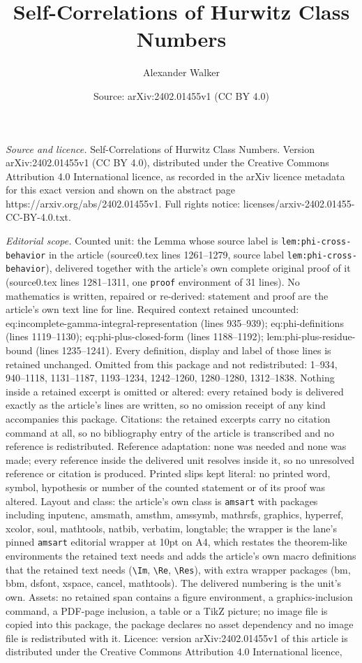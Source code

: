 \documentclass[10pt,a4paper]{amsart}
\title[Self-Correlations of Hurwitz Class Numbers]{Self-Correlations of Hurwitz Class Numbers}
\author{Alexander Walker}
\date{Source: arXiv:2402.01455v1 (CC BY 4.0)}
\begin{document}
\maketitle

\noindent\emph{Source and licence.} Self-Correlations of Hurwitz Class Numbers. Version arXiv:2402.01455v1 (CC BY 4.0), distributed under the Creative Commons Attribution 4.0 International licence, as recorded in the arXiv licence metadata for this exact version and shown on the abstract page https://arxiv.org/abs/2402.01455v1. Full rights notice: licenses/arxiv-2402.01455-CC-BY-4.0.txt.\par\smallskip

\noindent\textit{Editorial scope.} Counted unit: the Lemma whose source label is \texttt{lem:phi-cross-behavior} in the article (source0.tex lines 1261--1279, source label \texttt{lem:phi-cross-behavior}), delivered together with the article's own complete original proof of it (source0.tex lines 1281--1311, one \texttt{proof} environment of 31 lines). No mathematics is written, repaired or re-derived: statement and proof are the article's own text line for line. Required context retained uncounted: eq:incomplete-gamma-integral-representation (lines 935--939); eq:phi-definitions (lines 1119--1130); eq:phi-plus-closed-form (lines 1188--1192); lem:phi-plus-residue-bound (lines 1235--1241). Every definition, display and label of those lines is retained unchanged. Omitted from this package and not redistributed: 1--934, 940--1118, 1131--1187, 1193--1234, 1242--1260, 1280--1280, 1312--1838. Nothing inside a retained excerpt is omitted or altered: every retained body is delivered exactly as the article's lines are written, so no omission receipt of any kind accompanies this package. Citations: the retained excerpts carry no citation command at all, so no bibliography entry of the article is transcribed and no reference is redistributed. Reference adaptation: none was needed and none was made; every reference inside the delivered unit resolves inside it, so no unresolved reference or citation is produced. Printed slips kept literal: no printed word, symbol, hypothesis or number of the counted statement or of its proof was altered. Layout and class: the article's own class is \texttt{amsart} with packages including inputenc, amsmath, amsthm, amssymb, mathrsfs, graphics, hyperref, xcolor, soul, mathtools, natbib, verbatim, longtable; the wrapper is the lane's pinned \texttt{amsart} editorial wrapper at 10pt on A4, which restates the theorem-like environments the retained text needs and adds the article's own macro definitions that the retained text needs (\texttt{\textbackslash Im}, \texttt{\textbackslash Re}, \texttt{\textbackslash Res}), with extra wrapper packages (bm, bbm, dsfont, xspace, cancel, mathtools). The delivered numbering is the unit's own. Assets: no retained span contains a figure environment, a graphics-inclusion command, a PDF-page inclusion, a table or a TikZ picture; no image file is copied into this package, the package declares no asset dependency and no image file is redistributed with it. Licence: version arXiv:2402.01455v1 of this article is distributed under the Creative Commons Attribution 4.0 International licence, 
\end{document}
